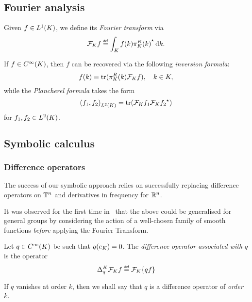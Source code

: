 \subsection{Fourier analysis}

Given $f \in \Lebesgue 1 \CompactGroup$,
we define its \emph{Fourier transform} via
\begin{align*}
    \Fourier [\CompactGroup] f \defeq \int_\CompactGroup f(k) \adj{\RightRegularRepresentation(k)} \dd k.
\end{align*}

If $f \in \SmoothFunctions \CompactGroup$,
then $f$ can be recovered via the following \emph{inversion formula}:
\begin{align*}
    f(k) = \tr(\RightRegularRepresentation(k) \Fourier [\CompactGroup] f),
    \quad k \in \CompactGroup,
\end{align*}
while the \emph{Plancherel formula} takes the form
\begin{align*}
    \ip [\Lebesgue 2 \CompactGroup] {f_1} {f_2}
    = \tr(\Fourier [\CompactGroup] f_1 \adj{\Fourier [\CompactGroup] f_2})
\end{align*}
for $f_1, f_2 \in \Lebesgue 2 \CompactGroup$.

\subsection{Symbolic calculus}

\subsubsection{Difference operators}

The success of our symbolic approach relies on successfully replacing difference operators on $\T^n$
and derivatives in frequency for $\R^n$.

It was observed for the first time in~\cite{RuzhanskyTurunen10}
that the above could be generalised for general groups by considering the action of a well-chosen family of smooth functions
\emph{before} applying the Fourier Transform.

\begin{definition}
    Let $q \in \SmoothFunctions \CompactGroup$ be such that $q(e_\CompactGroup) = 0$.
    The \emph{difference operator associated with $q$} is the operator
    \begin{align*}
        \DifferenceOperator [\CompactGroup] q \Fourier [\CompactGroup] f
        \defeq \Fourier [\CompactGroup] \{q f\}
    \end{align*}

    If $q$ vanishes at order $k$,
    then we shall say that $q$ is a difference operator of \emph{order} $k$.
\end{definition}

